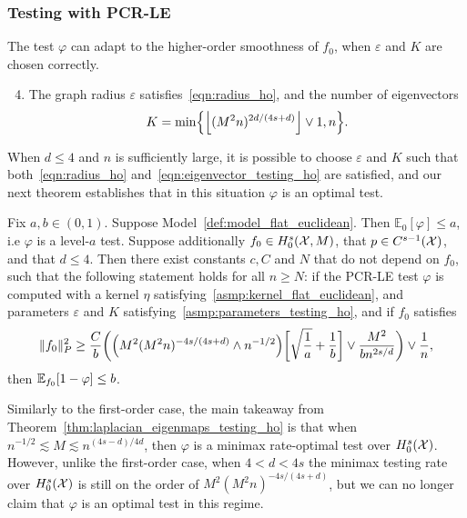\begin{itemize}
\end{itemize}

\subsubsection{Testing with PCR-LE}  The test $\varphi$ can adapt to the higher-order smoothness of $f_0$, when $\varepsilon$ and $K$ are chosen correctly.
\begin{enumerate}[label=(P\arabic*)]
	\setcounter{enumi}{3}
	\item 
	\label{asmp:parameters_testing_ho}
	The graph radius $\varepsilon$ satisfies~\eqref{eqn:radius_ho}, and the number of eigenvectors
	\begin{equation}
	\label{eqn:eigenvector_testing_ho}
	K = \min\Bigl\{\left\lfloor (M^2n)^{2d/(4s + d)} \right\rfloor \vee 1, n\Bigr\}.
	\end{equation}
\end{enumerate}
When $d \leq 4$ and $n$ is sufficiently large, it is possible to choose $\varepsilon$ and $K$ such that both~\eqref{eqn:radius_ho} and~\eqref{eqn:eigenvector_testing_ho} are satisfied, and our next theorem establishes that in this situation $\varphi$ is an optimal test.
\begin{theorem}
	\label{thm:laplacian_eigenmaps_testing_ho}
	Fix $a,b \in (0,1)$. Suppose Model~\ref{def:model_flat_euclidean}. Then $\mathbb{E}_0[\varphi] \leq a$, i.e $\varphi$ is a level-$a$ test. Suppose additionally $f_0 \in H_0^s(\mathcal{X},M)$, that $p \in C^{s-1}(\mathcal{X})$, and that $d \leq 4$. Then there exist constants $c,C$ and $N$ that do not depend on $f_0$, such that the following statement holds for all $n \geq N$: if the PCR-LE test $\varphi$ is computed with a kernel $\eta$ satisfying~\ref{asmp:kernel_flat_euclidean}, and parameters $\varepsilon$ and $K$ satisfying~\ref{asmp:parameters_testing_ho}, and if $f_0$ satisfies
	\begin{equation}
	\label{eqn:laplacian_eigenmaps_testing_criticalradius_ho}
	\|f_0\|_P^2 \geq \frac{C}{b}\biggl(\Bigl(M^2(M^2n)^{-4s/(4s + d) } \wedge n^{-1/2}\Bigr)\biggl[\sqrt{\frac{1}{a}} + \frac{1}{b}\biggr] \vee \frac{M^2}{b n^{2s/d}} \biggr) \vee \frac{1}{n},
	\end{equation}
	then $\mathbb{E}_{f_0}[1 - \varphi] \leq b$.
\end{theorem}
Similarly to the first-order case, the main takeaway from Theorem~\ref{thm:laplacian_eigenmaps_testing_ho} is that when $n^{-1/2} \lesssim M \lesssim n^{(4s - d)/4d}$, then $\varphi$ is a minimax rate-optimal test over $H_0^s(\mathcal{X})$. However, unlike the first-order case, when $4 < d < 4s$ the minimax testing rate over $H_0^s(\mathcal{X})$ is still on the order of $M^2(M^2n)^{-4s/(4s + d)}$, but we can no longer claim that $\varphi$ is an optimal test in this regime.

